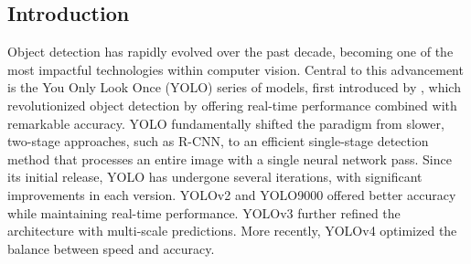\begin{multicols}{2}
	\section{Introduction}
	Object detection has rapidly evolved over the past decade, becoming one of the most impactful technologies within computer vision. Central to this advancement is the You Only Look Once (YOLO) series of models, first introduced by \citet{redmon2016lookonceunifiedrealtime}, which revolutionized object detection by offering real-time performance combined with remarkable accuracy.
	YOLO fundamentally shifted the paradigm from slower, two-stage approaches, such as R-CNN, to an efficient single-stage detection method that processes an entire image with a single neural network pass.
	Since its initial release, YOLO has undergone several iterations, with significant improvements in each version. YOLOv2 and YOLO9000 \citep{redmon2017yolo9000} offered better accuracy while maintaining real-time performance. YOLOv3 \citep{redmon2018yolov3} further refined the architecture with multi-scale predictions. More recently, YOLOv4 \citep{bochkovskiy2020yolov4} optimized the balance between speed and accuracy.
\end{multicols}